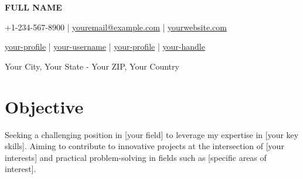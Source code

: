 \documentclass[a4paper,11pt]{article}
\newcommand{\socialicon}[1]{\raisebox{-0.05em}{\resizebox{!}{1em}{#1}}}
\newcommand{\headerfontiii}{\fontfamily{ppl}\selectfont} %
\begin{document}
\headerfontiii

\begin{center}
    {\Huge\textbf{FULL NAME}}
\end{center}
\vspace{-6mm}

\begin{center}
    \small{
    +1-234-567-8900 | \href{mailto:youremail@example.com}{youremail@example.com} | 
    \href{https://www.yourwebsite.com/}{yourwebsite.com}
    }
\end{center}
\vspace{-6mm}

\begin{center}
    \small{
    \socialicon{\faLinkedin} \href{https://www.linkedin.com/in/your-profile/}{your-profile} | 
    \socialicon{\faGithub} \href{https://github.com/your-username}{your-username} | 
    \socialicon{\faGlobe} \href{https://ieee-collabratec.ieee.org/app/p/your-profile}{your-profile} |
    \socialicon{\faTwitter} \href{https://twitter.com/your-handle}{your-handle}
    }
\end{center}
\vspace{-6mm}
\begin{center}
    \small{Your City, Your State - Your ZIP, Your Country}
\end{center}

\vspace{-4mm}

\section{\textbf{Objective}}
\vspace{1mm}
\small{
Seeking a challenging position in [your field] to leverage my expertise in [your key skills]. Aiming to contribute to innovative projects at the intersection of [your interests] and practical problem-solving in fields such as [specific areas of interest].
}
\vspace{-2mm}
\end{document}
